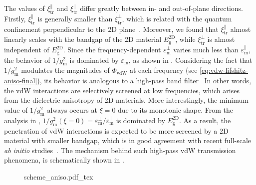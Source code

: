The values of $\xi_{\mathrm{tr}}^{\parallel}$ and
$\xi_{\mathrm{tr}}^{\parallel}$ differ greatly between in- and
out-of-plane directions.
%
Firstly, \(\xi_{\mathrm{tr}}^{\parallel}\) is generally smaller than
\(\xi_{\mathrm{tr}}^{\perp}\), which is related with the quantum
confinement perpendicular to the 2D
plane~\cite{Matthes_2016_effective_PRB}.
%
Moreover, we found that $\xi_{\mathrm{tr}}^{\parallel}$ almost
linearly scales with the bandgap of the 2D material
$E_{\mathrm{g}}^{\mathrm{2D}}$, while $\xi_{\mathrm{tr}}^{\perp}$ is
almost independent of $E_{\mathrm{g}}^{\mathrm{2D}}$. 
%
Since the frequency-dependent $\varepsilon_{\mathrm{m}}^{\perp}$ varies
much less than $\varepsilon_{\mathrm{m}}^{\parallel}$, the behavior of
\(1/g_{\mathrm{m}}^{2}\) is dominated by
$\varepsilon_{\mathrm{m}}^{\parallel}$, as shown in
.
%
Considering the fact that $1/g_{\mathrm{m}}^{2}$ modulates the
magnitudes of $\Phi_{\mathrm{vdW}}$ at each frequency (see
\autoref{eq:vdw-lifshitz-aniso-final}), its behavior is analogous to a
high-pass band filter~ 
%
In other words, the vdW interactions are selectively screened at low
frequencies, which arises from the dielectric anisotropy of 2D
materials.
%
More interestingly, the minimum value of $1/g_{\mathrm{m}}^{2}$ always
occurs at $\xi = 0$ due to its monotonic shape.
%
From the analysis in ,
$1/g_{\mathrm{m}}^{2}(\xi=0)=\varepsilon_{\mathrm{m}}^{\perp} /
\varepsilon_{\mathrm{m}}^{\parallel}$ is dominated by
$E_{\mathrm{g}}^{\mathrm{2D}}$.
%
As a result, the penetration of vdW interactions is expected to be
more screened by a 2D material with smaller bandgap, which is in good
agreement with recent full-scale \textit{ab initio}
studies~\cite{Liu_2018_gr}.
%
The mechanism behind such high-pass vdW transmission phenomena, is
schematically shown in .
\begin{figure}[h]
  \centering{}
  {scheme_aniso.pdf_tex}
  \caption{\label{fig:vdw-scheme-aniso} %
  }
\end{figure}



